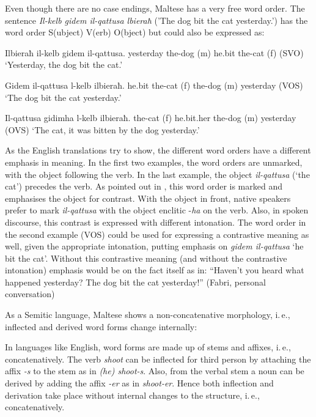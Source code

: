 \documentclass[]{../../metanetpaper}
\begin{document}
\begin{multicols}{2}

Even though there are no case endings, Maltese has a very free word order. The sentence \emph{Il-kelb gidem il-qattusa lbieraħ} ('The dog bit the cat yesterday.') has the word order S(ubject) V(erb) O(bject) but could also be expressed as:

\begin{examples}\label{WO_no_clitics}
\item
\gll Ilbieraħ il-kelb gidem il-qattusa.
yesterday	{the-dog (m)} he.bit	{the-cat (f)}
\gln (SVO)
\glt `Yesterday, the dog bit the cat.'
\glend

\item
\gll Gidem il-qattusa l-kelb ilbieraħ.
he.bit {the-cat (f)} {the-dog (m)} yesterday
\gln (VOS)
\glt `The dog bit the cat yesterday.'
\glend

\item
\gll Il-qattusa gidimha l-kelb ilbieraħ.
{the-cat (f)} he.bit.her {the-dog (m)} yesterday
\gln (OVS)
\glt `The cat, it was bitten by the dog yesterday.'
\glend
\end{examples}

As the English translations try to show, the different word orders have a different emphasis in meaning. In the first two examples, the word orders are unmarked, with the object following the verb. In the last example, the object \emph{il-qattusa} (`the cat') precedes the verb. As pointed out in \cite[p. 140]{Fabri:1993}, this word order is marked and emphasises the object for contrast. With the object in front, native speakers prefer to mark \emph{il-qattusa} with the object enclitic -\emph{ha} on the verb. Also, in spoken discourse, this contrast is expressed with different intonation. The word order in the second example (VOS) could be used for expressing a contrastive meaning as well, given the appropriate intonation, putting emphasis on \emph{gidem il-qattusa} `he bit the cat'. Without this contrastive meaning (and without the contrastive intonation) emphasis would be on the fact itself as in: ``Haven’t you heard what happened yesterday? The dog bit the cat yesterday!'' (Fabri, personal conversation)


As a Semitic language, Maltese shows a non-concatenative morphology, i.\,e., inflected and derived word forms change internally:

In languages like English, word forms are made up of stems and affixes, i.\,e., concatenatively. The verb \emph{shoot} can be inflected for third person by attaching the affix \emph{-s} to the stem as in \emph{(he) shoot-s}. Also, from the verbal stem a noun can be derived by adding the affix \emph{-er} as in \emph{shoot-er}. Hence both inflection and derivation take place without internal changes to the structure, i.\,e., concatenatively. 


\end{multicols}
\end{document}
